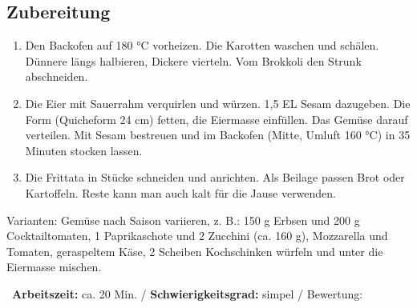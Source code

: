 \begin{minipage}[t]{0.58\textwidth}
\vspace{0pt}
\subsection*{Zubereitung}
\begin{enumerate}[leftmargin=*, itemindent=14pt]
\item Den Backofen auf 180 °C vorheizen. Die Karotten waschen und schälen. Dünnere längs halbieren, Dickere vierteln. Vom Brokkoli den Strunk abschneiden.\\ 

\item Die Eier mit Sauerrahm verquirlen und würzen. 1,5 EL Sesam dazugeben. Die Form (Quicheform 24 cm) fetten, die Eiermasse einfüllen. Das Gemüse darauf verteilen. Mit Sesam bestreuen und im Backofen (Mitte, Umluft 160 °C) in 35 Minuten stocken lassen. \\

\item Die Frittata in Stücke schneiden und anrichten. Als Beilage passen Brot oder Kartoffeln. Reste kann man auch kalt für die Jause verwenden. \\
\end{enumerate}
Varianten: Gemüse nach Saison variieren, z. B.: 150 g Erbsen und 200 g Cocktailtomaten, 1 Paprikaschote und 2 Zucchini (ca. 160 g), Mozzarella und Tomaten, geraspeltem Käse, 2 Scheiben Kochschinken würfeln und unter die Eiermasse mischen.
\end{minipage}
\vfill
\decothreeright \, \textbf{Arbeitszeit:} ca. 20 Min.	 / \textbf{Schwierigkeitsgrad:} simpel	 / \decothreeleft \hfill Bewertung: \LEFTcircle  \Circle \Circle  \Circle \Circle